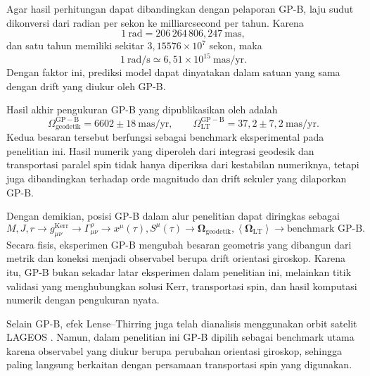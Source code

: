 Agar hasil perhitungan dapat dibandingkan dengan pelaporan GP-B, laju
sudut dikonversi dari radian per sekon ke milliarcsecond per tahun. Karena
\begin{equation}
    1~\text{rad}
    =206\,264\,806{,}247~\text{mas},
\end{equation}
dan satu tahun memiliki sekitar $3{,}15576\times10^7$ sekon, maka
\begin{equation}
    1~\text{rad/s}
    \simeq6{,}51\times10^{15}~\text{mas/yr}.
    \label{eq:konversi-masyr}
\end{equation}
Dengan faktor ini, prediksi model dapat dinyatakan dalam satuan yang sama
dengan drift yang diukur oleh GP-B.

Hasil akhir pengukuran GP-B yang dipublikasikan oleh
\textcite{Everitt2011GravityProbeB} adalah
\begin{equation}
    \Omega_{\mathrm{geodetik}}^{\mathrm{GP-B}}
    =6602\pm18~\text{mas/yr},
    \qquad
    \Omega_{\mathrm{LT}}^{\mathrm{GP-B}}
    =37{,}2\pm7{,}2~\text{mas/yr}.
    \label{eq:gpb-results}
\end{equation}
Kedua besaran tersebut berfungsi sebagai benchmark eksperimental pada
penelitian ini. Hasil numerik yang diperoleh dari integrasi geodesik dan
transportasi paralel spin tidak hanya diperiksa dari kestabilan numeriknya,
tetapi juga dibandingkan terhadap orde magnitudo dan drift sekuler yang
dilaporkan GP-B.

Dengan demikian, posisi GP-B dalam alur penelitian dapat diringkas sebagai
\begin{equation}
    M,J,r
    \longrightarrow
    g_{\mu\nu}^{\mathrm{Kerr}}
    \longrightarrow
    \Gamma^\rho_{\mu\nu}
    \longrightarrow
    x^\mu(\tau),S^\mu(\tau)
    \longrightarrow
    \bm{\Omega}_{\mathrm{geodetik}},
    \left\langle\bm{\Omega}_{\mathrm{LT}}\right\rangle
    \longrightarrow
    \text{benchmark GP-B}.
    \label{eq:gpb-validation-chain}
\end{equation}
Secara fisis, eksperimen GP-B mengubah besaran geometris yang dibangun dari
metrik dan koneksi menjadi observabel berupa drift orientasi giroskop.
Karena itu, GP-B bukan sekadar latar eksperimen dalam penelitian ini,
melainkan titik validasi yang menghubungkan solusi Kerr, transportasi spin,
dan hasil komputasi numerik dengan pengukuran nyata.

Selain GP-B, efek Lense--Thirring juga telah dianalisis menggunakan orbit
satelit LAGEOS \parencite{CiufoliniPavlis2004_LAGEOS}. Namun, dalam
penelitian ini GP-B dipilih sebagai benchmark utama karena observabel yang
diukur berupa perubahan orientasi giroskop, sehingga paling langsung
berkaitan dengan persamaan transportasi spin yang digunakan.



